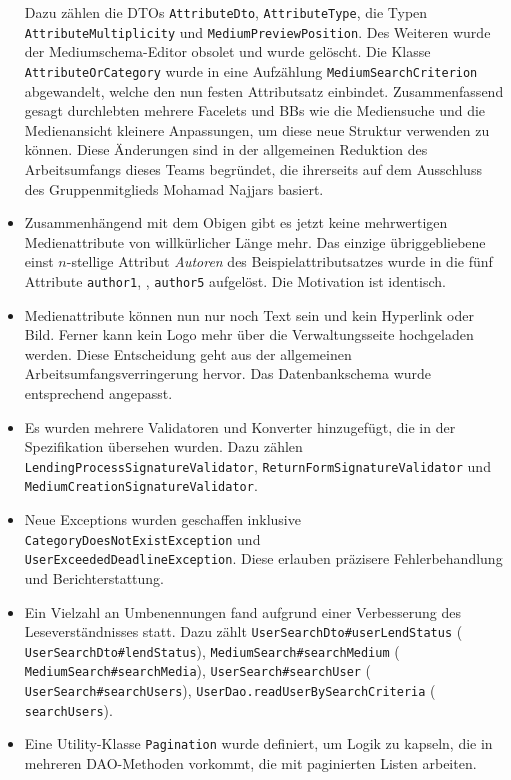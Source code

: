 \documentclass{article}
\begin{document}
\begin{itemize}
    Dazu zählen die DTOs \texttt{AttributeDto}, \texttt{AttributeType}, die Typen \texttt{AttributeMultiplicity} und \texttt{MediumPreviewPosition}. Des Weiteren wurde der Mediumschema-Editor obsolet und wurde gelöscht. Die Klasse \texttt{AttributeOrCategory} wurde in eine Aufzählung \texttt{MediumSearchCriterion} abgewandelt, welche den nun festen Attributsatz einbindet. Zusammenfassend gesagt durchlebten mehrere Facelets und BBs wie die Mediensuche und die Medienansicht kleinere Anpassungen, um diese neue Struktur verwenden zu können.
    Diese Änderungen sind in der allgemeinen Reduktion des Arbeitsumfangs dieses Teams begründet, die ihrerseits auf dem Ausschluss des Gruppenmitglieds Mohamad Najjars basiert.
    \item Zusammenhängend mit dem Obigen gibt es jetzt keine mehrwertigen Medienattribute von willkürlicher Länge mehr. Das einzige übriggebliebene einst $n$-stellige Attribut \textit{Autoren} des Beispielattributsatzes wurde in die fünf Attribute \texttt{author1}, \textellipsis, \texttt{author5} aufgelöst. Die Motivation ist identisch.
    \item Medienattribute können nun nur noch Text sein und kein Hyperlink oder Bild. Ferner kann kein Logo mehr über die Verwaltungsseite hochgeladen werden. Diese Entscheidung geht aus der allgemeinen Arbeitsumfangsverringerung hervor. Das Datenbankschema wurde entsprechend angepasst.
    \item Es wurden mehrere Validatoren und Konverter hinzugefügt, die in der Spezifikation übersehen wurden. Dazu zählen \texttt{LendingProcessSignatureValidator}, \texttt{ReturnFormSignatureValidator} und \texttt{MediumCreationSignatureValidator}.
    \item Neue Exceptions wurden geschaffen inklusive \texttt{CategoryDoesNotExistException} und\\ \texttt{UserExceededDeadlineException}. Diese erlauben präzisere Fehlerbehandlung und Berichterstattung.
    \item Ein Vielzahl an Umbenennungen fand aufgrund einer Verbesserung des Leseverständnisses statt. Dazu zählt \texttt{UserSearchDto\#userLendStatus} (\textrightarrow{} \texttt{UserSearchDto\#lendStatus}), \texttt{MediumSearch\#searchMedium} (\textrightarrow{} \texttt{MediumSearch\#searchMedia}), \texttt{UserSearch\#searchUser} (\textrightarrow{} \texttt{UserSearch\#searchUsers}), \texttt{UserDao.readUserBySearchCriteria} (\textrightarrow{} \texttt{searchUsers}).
    \item Eine Utility-Klasse \texttt{Pagination} wurde definiert, um Logik zu kapseln, die in mehreren DAO-Methoden vorkommt, die mit paginierten Listen arbeiten.

\end{itemize}
\end{document}
